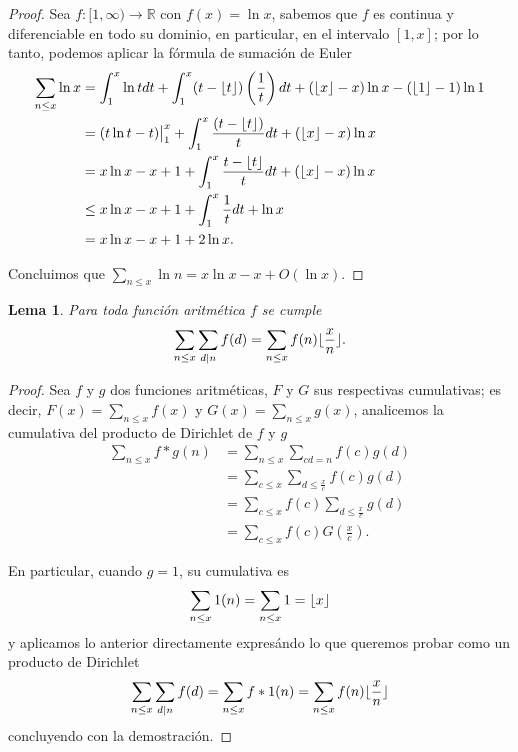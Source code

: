 \documentclass{article}
\DeclarePairedDelimiter\floor{\lfloor}{\rfloor}
\newtheorem{lemma}[theorem]{Lema}
\theoremstyle{definition}
\theoremstyle{remark}
\newcommand{\BR}{\mathbb R}
\begin{document}
\begin{proof}
Sea $f : [1, \infty) \to \BR$ con $f(x) = \ln x$, sabemos que $f$ es continua y diferenciable en todo su dominio, 
en particular, en el intervalo $[1, x]$; por lo tanto, podemos aplicar la f\'ormula de sumaci\'on de Euler
\begin{align*}
\sum_{n \leq x} \ln x &= \int_1^x \ln t dt + \int_1^x (t - \floor{t})\left(\frac{1}{t}\right) dt + (\floor{x} - x) \ln x - (\floor{1} - 1) \ln 1 \\
&= (t \ln t - t) \big|_1^x + \int_1^x \frac{(t - \floor{t})}{t} dt + (\floor{x} - x) \ln x \\
&= x \ln x - x + 1 + \int_1^x \frac{t - \floor{t}}{t} dt + (\floor{x} - x) \ln x \\
&\leq x \ln x - x + 1 + \int_1^x \frac{1}{t} dt + \ln x \\
&= x \ln x - x + 1 + 2 \ln x.
\end{align*}

Concluimos que $\sum_{n \leq x} \ln n = x\ln x - x + O(\ln x)$.
\end{proof}

\begin{lemma}
Para toda funci\'on aritm\'etica $f$ se cumple
$$\sum_{n \leq x} \sum_{d \mid n} f(d) = \sum_{n \leq x} f(n) \floor{\frac{x}{n}}.$$
\end{lemma}

\begin{proof}
Sea $f$ y $g$ dos funciones aritm\'eticas, $F$ y $G$ sus respectivas cumulativas;
es decir, $F(x) = \sum_{n \leq x} f(x)$ y $G(x) = \sum_{n \leq x} g(x)$,
analicemos la cumulativa del producto de Dirichlet de $f$ y $g$
\begin{align*}
\sum_{n \leq x} f * g (n) &= \sum_{n \leq x} \sum_{cd = n} f(c)g(d) \\
&= \sum_{c \leq x} \sum_{d \leq \frac{x}{c}} f(c) g(d) \\
&= \sum_{c \leq x} f(c) \sum_{d \leq \frac{x}{c}} g(d) \\
&= \sum_{c \leq x} f(c) G\left(\frac{x}{c}\right).
\end{align*}

En particular, cuando $g = 1$, su cumulativa es
$$\sum_{n \leq x} 1(n) = \sum_{n \leq x} 1 = \floor{x}$$
y aplicamos lo anterior directamente expres\'ando lo que queremos probar como un producto de Dirichlet
$$\sum_{n \leq x} \sum_{d \mid n} f(d) = \sum_{n \leq x} f * 1 (n) = \sum_{n \leq x} f(n) \floor{\frac{x}{n}}$$
concluyendo con la demostraci\'on.
\end{proof}
\end{document}
